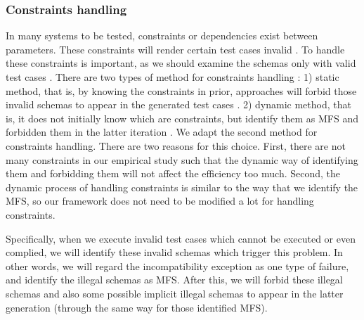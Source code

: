 \documentclass[10pt,journal,compsoc]{IEEEtran}
\begin{document}

%

\subsubsection{Constraints handling}\label{sec:app:constriants handling}
In many systems to be tested, constraints or dependencies exist between parameters. These constraints will render certain test cases invalid \cite{cohen2008constructing}. To handle these constraints is important, as we should examine the schemas only with valid test cases \cite{yilmaz2013reducing}. There are two types of method for constraints handling : 1) static method, that is, by knowing the constraints in prior, approaches will forbid those invalid schemas to appear in the generated test cases \cite{cohen2007exploiting,cohen2008constructing,grindal2006handling,jin2014configurations,yu2015constraint}. 2) dynamic method, that is, it does not initially know which are constraints, but identify them as MFS and forbidden them in the latter iteration \cite{yilmaz2013reducing}.  We adapt the second method for constraints handling.
{\color{red} There are two reasons for this choice. First, there are not many constraints in our empirical study such that the dynamic way of identifying them and forbidding them will not affect the efficiency too much.  Second, the dynamic process of handling constraints is similar to the way that we identify the MFS, so our framework does not need to be modified a lot for handling constraints.}

Specifically, when we execute invalid test cases which cannot be executed or even complied, we will identify these invalid schemas which trigger this problem. In other words, we will regard the incompatibility exception as one type of failure, and identify the illegal schemas as MFS. After this, we will forbid these illegal schemas and also some possible implicit illegal schemas to appear in the latter generation (through the same way for those identified MFS).
\end{document}
